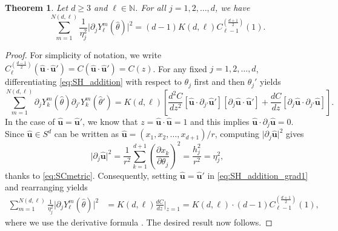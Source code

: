 \documentclass[11pt]{amsart}
\theoremstyle{definition}
\theoremstyle{plain}
\newtheorem{theorem}[definition]{Theorem}
\theoremstyle{remark}
\newcommand{\N}{\mathbb{N}}
\newcommand{\del}{\partial}
\renewcommand{\vec}[1]{\hat{\boldsymbol{#1}}}
\newcommand{\abs}[1]{\lvert{#1}\rvert}
\begin{document}
\begin{theorem} \label{thm:SH_addition_grad}
Let $d\ge 3$ and $\ell\in\N$. For all $j = 1, 2, \dots, d$, we have  
\begin{equation*} 
\sum_{m = 1}^{N(d, \ell)} \frac{1}{\eta_j^2}\abs{\del_jY_\ell^m(\hat\theta)}^2 = (d - 1)K(d, \ell)C_{\ell - 1}^{\left(\frac{d + 1}{2}\right)}(1). 
\end{equation*} 
\end{theorem} 
\begin{proof} 
For simplicity of notation, we write $C_\ell^{\left(\frac{d - 1}{2}\right)}(\vec{u}\cdot\vec{u}') = C(\vec{u}\cdot\vec{u}') = C(z)$. For any fixed $j = 1, 2, \dots, d$, differentiating \eqref{eq:SH_addition} with respect to $\theta_j$ first and then $\theta_j'$ yields 
\begin{equation} \label{eq:SH_addition_grad1}
\sum_{m = 1}^{N(d, \ell)} \del_jY_k^m(\hat\theta)\del_{j'}Y_k^m(\hat\theta') = K(d, \ell)\left[\frac{d^2C}{dz^2}\left[\vec{u}\cdot\del_{j'}\vec{u}'\right]\left[\del_j\vec{u}\cdot\vec{u}'\right] + \frac{dC}{dz}\left[\del_j\vec{u}\cdot \del_{j'}\vec{u}\right]\right]. 
\end{equation} 
In the case of $\vec{u} = \vec{u}'$, we know that $z = \vec{u}\cdot\vec{u} = 1$ and this implies $\vec{u}\cdot\del_j\vec{u} = 0$. Since $\vec{u}\in S^d$ can be written as $\vec{u} = \left(x_1, x_2, \dots, x_{d + 1}\right)/r$, computing $\abs{\del_j\vec{u}}^2$ gives 
\begin{equation*} 
\abs{\del_j\vec{u}}^2 = \frac{1}{r^2}\sum_{k = 1}^{d + 1} \left(\frac{\del x_k}{\del\theta_j}\right)^2 = \frac{h_j^2}{r^2} = \eta_j^2, 
\end{equation*} 
thanks to \eqref{eq:SCmetric}. Consequently, setting $\vec{u} = \vec{u}'$ in \eqref{eq:SH_addition_grad1} and rearranging yields  
\begin{align*} 
\sum_{m = 1}^{N(d, \ell)} \frac{1}{\eta_j^2}\abs{\del_jY_\ell^m(\hat\theta)}^2 & = K(d, \ell)\frac{dC}{dz}\bigg|_{z = 1} = K(d, \ell)\cdot (d - 1)C_{\ell - 1}^{\left(\frac{d + 1}{2}\right)}(1),  
\end{align*} 
where we use the derivative formula \cite[Eq.~18.9.19]{NIST}. The desired result now follows. 
\end{proof} 

\end{document}
